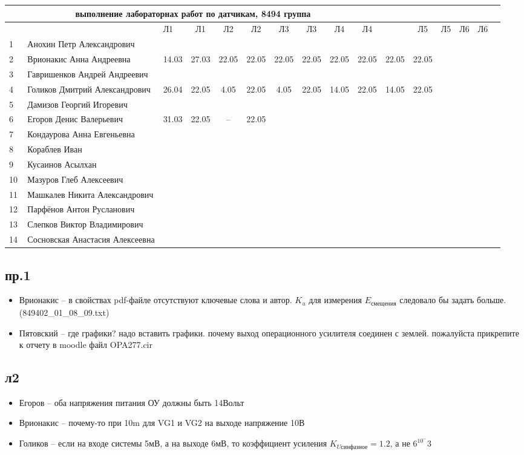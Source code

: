 \newpage
%
\begin{tabular}{l|llccccccccccccc}
\multicolumn{10}{c}{выполнение лабораторнах работ по датчикам, 8494 группа} \\
\toprule
&&Л1&Л1& Л2&Л2& Л3&Л3& Л4&Л4& &Л5&Л5& Л6&Л6\\
\midrule
1\,&   Анохин Петр Александрович       &&&&&&&&\\
	2\,&   Врионакис Анна Андреевна        &14.03&27.03&22.05&22.05&22.05&22.05&22.05&22.05& 22.05&22.05\\
3\,&   Гавришенков Андрей Андреевич    &&&&&&&&\\
	4\,&   Голиков Дмитрий Александрович   &26.04&22.05& 4.05 &22.05& 4.05 &22.05&14.05&22.05&14.05&22.05\\
5\,&   Дамизов Георгий Игоревич        &&&&&&&&\\
\midrule
6\,&   Егоров Денис Валерьевич         &31.03&22.05& --    & 22.05 &&&&\\
7\,&   Кондаурова Анна Евгеньевна      &&&&&&&&\\
8\,&   Кораблев Иван                   &&&&&&&&\\
9\,&   Кусаинов Асылхан                &&&&&&&&\\
10\,&  Мазуров Глеб Алексеевич         &&&&&&&&\\
\midrule
11\,&  Машкалев Никита Александрович   &&&&&&&&\\
12\,&  Парфёнов Антон Русланович       &&&&&&&&\\
13\,&  Слепков Виктор Владимирович     &&&&&&&&\\
14\,&  Сосновская Анастасия Алексеевна &&&&&&&&\\
\bottomrule
\end{tabular}

\subsection*{пр.1}
\begin{itemize}
	\item Врионакис -- в свойствах pdf-файле отсутствуют ключевые слова и автор. $K_u$ для измерения $E_\text{смещения}$ следовало бы задать больше. (849402\_01\_08\_09.txt)
	\item Пятовский --
		где графики? надо вставить графики.
почему выход операционного усилителя соединен с землей.
пожалуйста прикрепите к отчету в moodle файл   OPA277.cir
\end{itemize}

\subsection{л2}
\begin{itemize}
\item Егоров -- оба напряжения питания ОУ должны быть 14Вольт
\item Врионакис -- почему-то при 10m для VG1 и VG2 на выходе напряжение 10В
\item Голиков -- если на входе системы 5мВ, а на выходе 6мВ, то коэффициент усиления $K_{U\text{синфазное}} = 1.2$, а не $6^10^-3$ 
\end{itemize}

